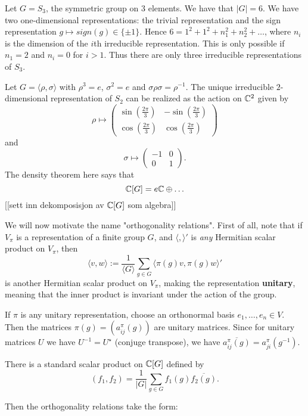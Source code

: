 \documentclass[11pt, english]{article}
\begin{document}
\begin{example}
Let $G=S_3$, the symmetric group on $3$ elements. We have that $\lvert G \rvert = 6$. We have two one-dimensional representations: the trivial representation and the sign representation $g \mapsto sign(g) \in \{ \pm 1 \}$. Hence $6=1^2+1^2+n_1^2+n_2^2+\ldots$, where $n_i$ is the dimension of the $i$th irreducible representation. This is only possible if $n_1=2$ and $n_i=0$ for $i >1$. Thus there are only three irreducible representations of $S_3$.

Let $G=\langle \rho, \sigma \rangle$ with $\rho^3=e$, $\sigma^2=e$ and $\sigma \rho \sigma = \rho^{-1}$. The unique irreducible $2$-dimensional representation of $S_2$ can be realized as the action on $\mathbb{C}^2$ given by 
$$
\rho \mapsto \begin{pmatrix}
\sin\left( \frac{2 \pi}{3} \right) & - \sin \left( \frac{2 \pi}{3} \right) \\
\cos \left( \frac{2\pi}{3} \right) & \cos \left( \frac{2 \pi}{3} \right)
\end{pmatrix}
$$
and 
$$
\sigma \mapsto \begin{pmatrix}
-1 & 0 \\
0 & 1 
\end{pmatrix}.
$$
The density theorem here says that 
$$
\mathbb{C}[G] = e \mathbb{C} \oplus \ldots
$$
[[sett inn dekomposisjon av $\mathbb{C}[G]$ som algebra]]
\end{example}

We will now motivate the name "orthogonality relations". First of all, note that if $V_\pi$ is a representation of a finite group $G$, and $\langle,\rangle'$ is \emph{any} Hermitian scalar product on $V_\pi$, then 
$$
\langle v, w \rangle := \frac{1}{\langle G \rangle} \sum_{g \in G} \langle \pi(g) v, \pi(g) w \rangle'
$$
is another Hermitian scalar product on $V_\pi$, making the representation \textbf{unitary}, meaning that the inner product is invariant under the action of the group.

If $\pi$ is any unitary representation, choose an orthonormal basis $e_1,\ldots,e_n \in V$. Then the matrices $\pi(g) = \left( a_{ij}^\pi(g) \right)$ are unitary matrices. Since for unitary matrices $U$ we have $U^{-1}=U^\star$ (conjuge transpose), we have $\overline{a_{ij}^\pi(g)} = a_{ji}^\pi(g^{-1})$.

There is a standard scalar product on $\mathbb{C}[G]$ defined by
$$
(f_1,f_2) = \frac 1{\lvert G \rvert} \sum_{g \in G} f_1(g) \overline{f_2(g)}.
$$

Then the orthogonality relations take the form:
\end{document}
